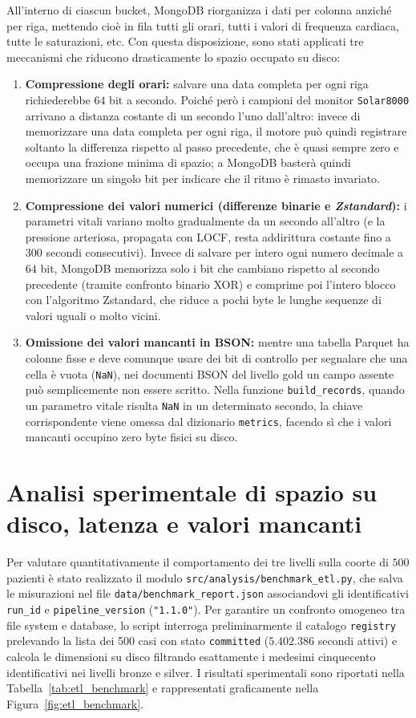 All'interno di ciascun bucket, MongoDB riorganizza i dati per colonna anzich\'e per riga, mettendo cio\`e in fila tutti gli orari, tutti i valori di frequenza cardiaca, tutte le saturazioni, etc. Con questa disposizione, sono stati applicati tre meccanismi che riducono drasticamente lo spazio occupato su disco:
\begin{enumerate}
    \item \textbf{Compressione degli orari:} salvare una data completa per ogni riga richiederebbe $64$ bit a secondo. Poich\'e per\`o i campioni del monitor \texttt{Solar8000} arrivano a distanza costante di un secondo l'uno dall'altro: invece di memorizzare una data completa per ogni riga, il motore pu\`o quindi registrare soltanto la differenza rispetto al passo precedente, che \`e quasi sempre zero e occupa una frazione minima di spazio; a MongoDB baster\`a quindi memorizzare un singolo bit per indicare che il ritmo \`e rimasto invariato.    \item \textbf{Compressione dei valori numerici (differenze binarie e \textit{Zstandard}):} i parametri vitali variano molto gradualmente da un secondo all'altro (e la pressione arteriosa, propagata con LOCF, resta addirittura costante fino a $300$ secondi consecutivi). Invece di salvare per intero ogni numero decimale a $64$ bit, MongoDB memorizza solo i bit che cambiano rispetto al secondo precedente (tramite confronto binario XOR) e comprime poi l'intero blocco con l'algoritmo Zstandard, che riduce a pochi byte le lunghe sequenze di valori uguali o molto vicini.    \item \textbf{Omissione dei valori mancanti in BSON:} mentre una tabella Parquet ha colonne fisse e deve comunque usare dei bit di controllo per segnalare che una cella \`e vuota (\texttt{NaN}), nei documenti BSON del livello gold un campo assente pu\`o semplicemente non essere scritto. Nella funzione \texttt{build\_records}, quando un parametro vitale risulta \texttt{NaN} in un determinato secondo, la chiave corrispondente viene omessa dal dizionario \texttt{metrics}, facendo s\`i che i valori mancanti occupino zero byte fisici su disco.\end{enumerate}

\section{Analisi sperimentale di spazio su disco, latenza e valori mancanti}
Per valutare quantitativamente il comportamento dei tre livelli sulla coorte di $500$ pazienti \`e stato realizzato il modulo \texttt{src/analysis/benchmark\_etl.py}, che salva le misurazioni nel file \texttt{data/benchmark\_report.json} associandovi gli identificativi \texttt{run\_id} e \texttt{pipeline\_version} (\texttt{"1.1.0"}). Per garantire un confronto omogeneo tra file system e database, lo script interroga preliminarmente il catalogo \texttt{registry} prelevando la lista dei 500 casi con stato \texttt{committed} ($5.402.386$ secondi attivi) e calcola le dimensioni su disco filtrando esattamente i medesimi cinquecento identificativi nei livelli bronze e silver. I risultati sperimentali sono riportati nella Tabella~\ref{tab:etl_benchmark} e rappresentati graficamente nella Figura~\ref{fig:etl_benchmark}.

